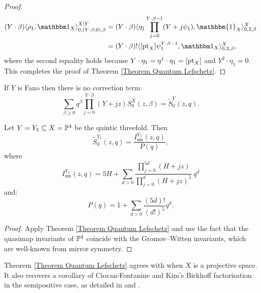 \begin{proof}
\begin{align*}
(Y\cdot\beta)\langle \rho_1 ,\mathbbm 1_{X}\rangle_{0,(Y\cdot\beta,0),\beta}^{X|Y} & = (Y\cdot\beta) \langle \eta_1 \prod_{j=0}^{Y\cdot\beta-1}(Y+j\psi_1) , \mathbbm{1}_X \rangle_{0,2,\beta}^X \\
& = (Y\cdot\beta)!\langle[ \pt_X]\psi_1^{Y\cdot\beta-1},\mathbbm 1_X\rangle_{0,2,\beta}^X,
\end{align*}
where the second equality holds because $Y\cdot\eta_1=\eta^1 \cdot \eta_1 = [\operatorname{pt}_X]$ and $Y^2\cdot\eta_1=0$. This completes the proof of Theorem \ref{Theorem Quantum Lefschetz}. \end{proof}

\begin{cor}
 If $Y$ is Fano then there is no correction term:
\begin{equation*} \sum_{\beta\geq 0} q^\beta\prod_{j=0}^{Y\cdot\beta}(Y+jz)S_0^X(z,\beta) = \tilde{S}_0^Y(z,q). \end{equation*}
\end{cor}

\begin{cor}
Let $Y = Y_5 \subseteq  X = \mathbb P^4$ be the quintic threefold. Then
\begin{equation*} \tilde{S}_0^{Y_5}(z,q)=\dfrac{I_{\text{sm}}^{Y_5}(z,q)}{P(q)}, \end{equation*}
where
\begin{equation*} I_{\text{sm}}^{Y_5}(z,q)=5H+\sum_{d>0}\frac{\prod_{j=0}^{5d}(H+jz)}{\prod_{j=0}^{d}(H+jz)^5} \ q^d \end{equation*}
and:
\begin{equation*} P(q)=1+\sum_{d>0}\frac{(5d)!}{(d!)^5}q^d. \end{equation*}
\end{cor}
\begin{proof} Apply Theorem \ref{Theorem Quantum Lefschetz} and use the fact that the quasimap invariants of $\mathbb P^4$ coincide with the Gromov--Witten invariants, which are well-known from mirror symmetry. \end{proof}

\begin{rmk}
Theorem \ref{Theorem Quantum Lefschetz} agrees with \cite[Theorem~1]{CZ-mirror} when $X$ is a projective space. It also recovers a corollary of Ciocan-Fontanine and Kim's Birkhoff factorisation in the semipositive case, as detailed in \cite[\S 5.5]{CF-K-wallcrossing} and \cite[\S 5.6]{BN}.
\end{rmk}

